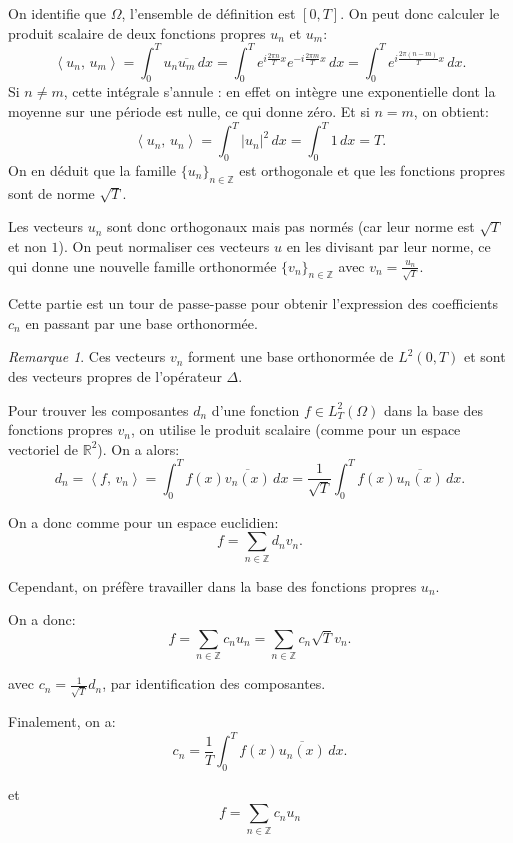 \documentclass[11pt,a4paper]{article}
\numberwithin{equation}{section}
\theoremstyle{plain}
\theoremstyle{definition}
\theoremstyle{remark}
\newtheorem*{remark}{Remarque}
\newcommand{\R}{\mathbb{R}}
\newcommand{\Z}{\mathbb{Z}}
\newcommand{\ip}[2]{\left\langle #1,\, #2\right\rangle}
\newcommand{\Lap}{\Delta}
\begin{document}
\begin{solution}
    On identifie que $\Omega$, l'ensemble de définition est $[0,T]$.
    On peut donc calculer le produit scalaire de deux fonctions propres $u_n$ et $u_m$:
    \[
        \ip{u_n}{u_m} = \int_0^T u_n \overline{u_m}\,dx = \int_0^T e^{i\frac{2\pi n}{T}x} e^{-i\frac{2\pi m}{T}x}\,dx = \int_0^T e^{i\frac{2\pi (n-m)}{T}x}\,dx.
    \]
    Si $n \neq m$, cette intégrale s'annule : en effet on intègre une exponentielle dont la moyenne sur une période est nulle, ce qui donne zéro.
    Et si $n = m$, on obtient:
    \[
        \ip{u_n}{u_n} = \int_0^T |u_n|^2\,dx = \int_0^T 1\,dx = T.
    \]
    On en déduit que la famille $\{u_n\}_{n \in \Z}$ est orthogonale et que les fonctions propres sont de norme $\sqrt{T}$.
\end{solution}

Les vecteurs $u_n$ sont donc orthogonaux mais pas normés (car leur norme est $\sqrt{T}$ et non $1$).
On peut normaliser ces vecteurs $u$ en les divisant par leur norme, ce qui donne une nouvelle famille orthonormée $\{v_n\}_{n \in \Z}$ avec $v_n = \frac{u_n}{\sqrt{T}}$.

Cette partie est un tour de passe-passe pour obtenir l'expression des coefficients $c_n$ en passant par une base orthonormée.

\begin{remark}
    Ces vecteurs $v_n$ forment une base orthonormée de $L^2(0,T)$ et sont des vecteurs propres de l'opérateur $\Lap$.
\end{remark}

Pour trouver les composantes $d_n$ d'une fonction $f \in L^2_T(\Omega)$ dans la base des fonctions propres $v_n$, on utilise le produit scalaire (comme pour un espace vectoriel de $\R^2$).
On a alors:
\[
    d_n = \ip{f}{v_n} = \int_0^T f(x) \overline{v_n(x)}\,dx = \frac{1}{\sqrt{T}} \int_0^T f(x) \overline{u_n(x)}\,dx.
\]


On a donc comme pour un espace euclidien:
\[
    f = \sum_{n \in \Z} d_n v_n.
\]

Cependant, on préfère travailler dans la base des fonctions propres $u_n$.

On a donc:
\[
    f = \sum_{n \in \Z} c_n u_n = \sum_{n \in \Z} c_n\sqrt{T} v_n.
\]

avec $c_n = \frac{1}{\sqrt{T}} d_n$, par identification des composantes.

Finalement, on a:
\[
    c_n = \frac{1}{T} \int_0^T f(x) \overline{u_n(x)}\,dx.
\]

et 
\begin{equation} \label{eq:fourier}
    f = \sum_{n \in \Z} c_n u_n    
\end{equation}
\end{document}
